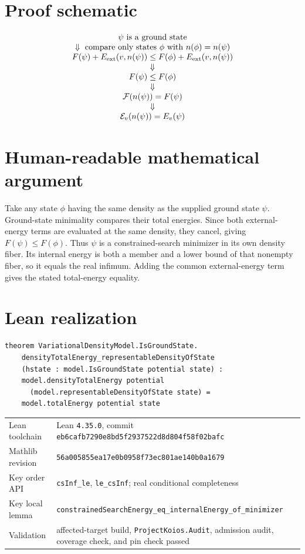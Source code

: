 \section{Proof schematic}
\[
\begin{array}{c}
 \psi\text{ is a ground state}\\
 \Downarrow\ \text{compare only states }\phi\text{ with }n(\phi)=n(\psi)\\
 F(\psi)+E_{\rm ext}(v,n(\psi))
 \le F(\phi)+E_{\rm ext}(v,n(\psi))\\
 \Downarrow\\
 F(\psi)\le F(\phi)\\
 \Downarrow\\
 \mathcal F(n(\psi))=F(\psi)\\
 \Downarrow\\
 \mathcal E_v(n(\psi))=E_v(\psi)
\end{array}
\]

\section{Human-readable mathematical argument}
Take any state \(\phi\) having the same density as the supplied ground state \(\psi\).  Ground-state
minimality compares their total energies.  Since both external-energy terms are evaluated at the
same density, they cancel, giving \(F(\psi)\le F(\phi)\).  Thus \(\psi\) is a constrained-search
minimizer in its own density fiber.  Its internal energy is both a member and a lower bound of that
nonempty fiber, so it equals the real infimum.  Adding the common external-energy term gives the
stated total-energy equality.

\section{Lean realization}
\begin{lstlisting}
theorem VariationalDensityModel.IsGroundState.
    densityTotalEnergy_representableDensityOfState
    (hstate : model.IsGroundState potential state) :
    model.densityTotalEnergy potential
      (model.representableDensityOfState state) =
    model.totalEnergy potential state
\end{lstlisting}
\begin{tabularx}{\textwidth}{@{}lY@{}}
\toprule
Lean toolchain & Lean \texttt{4.35.0}, commit \texttt{eb6cafb7290e8bd5f2937522d8d804f58f02bafc} \\
Mathlib revision & \texttt{56a005855ea17e0b0958f73ec801ae140b0a1679} \\
Key order API & \texttt{csInf\_le}, \texttt{le\_csInf}; real conditional completeness \\
Key local lemma & \texttt{constrainedSearchEnergy\_eq\_internalEnergy\_of\_minimizer} \\
Validation & affected-target build, \texttt{ProjectKoios.Audit}, admission audit, coverage check, and pin check passed \\
\bottomrule
\end{tabularx}

